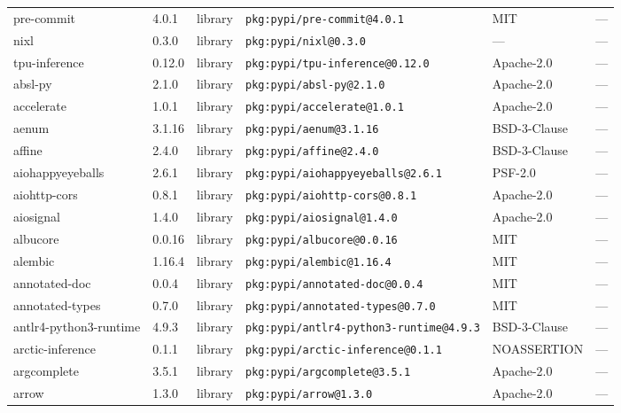\documentclass[11pt,a4paper]{article}
\begin{document}
\begin{longtable}{|p{4cm}|p{2cm}|p{1.6cm}|p{5cm}|p{1.5cm}|p{3.5cm}|}
\raggedright pre-commit & 4.0.1 & library & \small\texttt{pkg:pypi/pre-commit@4.0.1} & MIT & \small — \\
\raggedright nixl & 0.3.0 & library & \small\texttt{pkg:pypi/nixl@0.3.0} & — & \small — \\
\raggedright tpu-inference & 0.12.0 & library & \small\texttt{pkg:pypi/tpu-inference@0.12.0} & Apache-2.0 & \small — \\
\raggedright absl-py & 2.1.0 & library & \small\texttt{pkg:pypi/absl-py@2.1.0} & Apache-2.0 & \small — \\
\raggedright accelerate & 1.0.1 & library & \small\texttt{pkg:pypi/accelerate@1.0.1} & Apache-2.0 & \small — \\
\raggedright aenum & 3.1.16 & library & \small\texttt{pkg:pypi/aenum@3.1.16} & BSD-3-Clause & \small — \\
\raggedright affine & 2.4.0 & library & \small\texttt{pkg:pypi/affine@2.4.0} & BSD-3-Clause & \small — \\
\raggedright aiohappyeyeballs & 2.6.1 & library & \small\texttt{pkg:pypi/aiohappyeyeballs@2.6.1} & PSF-2.0 & \small — \\
\raggedright aiohttp-cors & 0.8.1 & library & \small\texttt{pkg:pypi/aiohttp-cors@0.8.1} & Apache-2.0 & \small — \\
\raggedright aiosignal & 1.4.0 & library & \small\texttt{pkg:pypi/aiosignal@1.4.0} & Apache-2.0 & \small — \\
\raggedright albucore & 0.0.16 & library & \small\texttt{pkg:pypi/albucore@0.0.16} & MIT & \small — \\
\raggedright alembic & 1.16.4 & library & \small\texttt{pkg:pypi/alembic@1.16.4} & MIT & \small — \\
\raggedright annotated-doc & 0.0.4 & library & \small\texttt{pkg:pypi/annotated-doc@0.0.4} & MIT & \small — \\
\raggedright annotated-types & 0.7.0 & library & \small\texttt{pkg:pypi/annotated-types@0.7.0} & MIT & \small — \\
\raggedright antlr4-python3-runtime & 4.9.3 & library & \small\texttt{pkg:pypi/antlr4-python3-runtime@4.9.3} & BSD-3-Clause & \small — \\
\raggedright arctic-inference & 0.1.1 & library & \small\texttt{pkg:pypi/arctic-inference@0.1.1} & NOASSERTION & \small — \\
\raggedright argcomplete & 3.5.1 & library & \small\texttt{pkg:pypi/argcomplete@3.5.1} & Apache-2.0 & \small — \\
\raggedright arrow & 1.3.0 & library & \small\texttt{pkg:pypi/arrow@1.3.0} & Apache-2.0 & \small — \\

\end{longtable}
\end{document}
